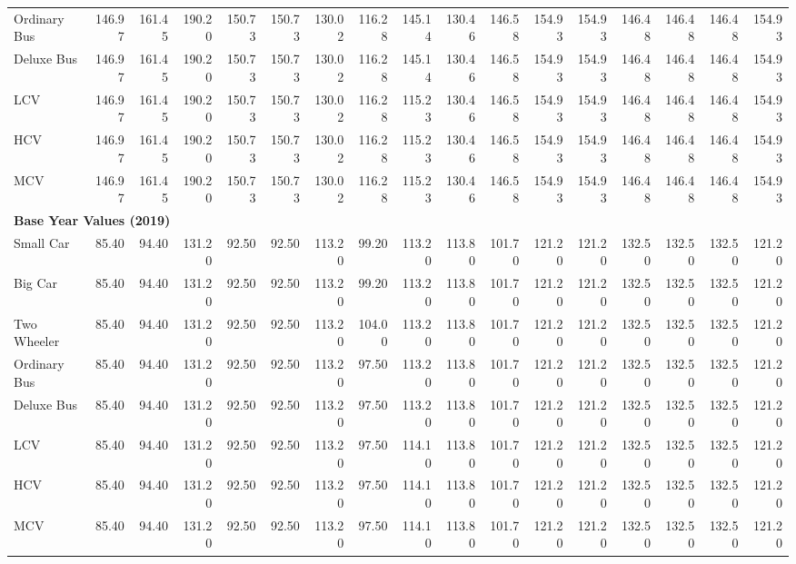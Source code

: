 \documentclass[12pt,a4paper]{article}
\begin{document}
\begin{landscape}
\begin{table}[H]
\begin{adjustbox}{width=\linewidth}
\begin{tabular}{lrrrrrrrrrrrrrrrr}
Ordinary Bus&146.97&161.45&190.20&150.73&150.73&130.02&116.28&145.14&130.46&146.58&154.93&154.93&146.48&146.48&146.48&154.93\\%
Deluxe Bus&146.97&161.45&190.20&150.73&150.73&130.02&116.28&145.14&130.46&146.58&154.93&154.93&146.48&146.48&146.48&154.93\\%
LCV&146.97&161.45&190.20&150.73&150.73&130.02&116.28&115.23&130.46&146.58&154.93&154.93&146.48&146.48&146.48&154.93\\%
HCV&146.97&161.45&190.20&150.73&150.73&130.02&116.28&115.23&130.46&146.58&154.93&154.93&146.48&146.48&146.48&154.93\\%
MCV&146.97&161.45&190.20&150.73&150.73&130.02&116.28&115.23&130.46&146.58&154.93&154.93&146.48&146.48&146.48&154.93\\%
\midrule%
\multicolumn{17}{l}{\textbf{Base Year Values (2019)}} \\%
\midrule%
Small Car&85.40&94.40&131.20&92.50&92.50&113.20&99.20&113.20&113.80&101.70&121.20&121.20&132.50&132.50&132.50&121.20\\%
Big Car&85.40&94.40&131.20&92.50&92.50&113.20&99.20&113.20&113.80&101.70&121.20&121.20&132.50&132.50&132.50&121.20\\%
Two Wheeler&85.40&94.40&131.20&92.50&92.50&113.20&104.00&113.20&113.80&101.70&121.20&121.20&132.50&132.50&132.50&121.20\\%
Ordinary Bus&85.40&94.40&131.20&92.50&92.50&113.20&97.50&113.20&113.80&101.70&121.20&121.20&132.50&132.50&132.50&121.20\\%
Deluxe Bus&85.40&94.40&131.20&92.50&92.50&113.20&97.50&113.20&113.80&101.70&121.20&121.20&132.50&132.50&132.50&121.20\\%
LCV&85.40&94.40&131.20&92.50&92.50&113.20&97.50&114.10&113.80&101.70&121.20&121.20&132.50&132.50&132.50&121.20\\%
HCV&85.40&94.40&131.20&92.50&92.50&113.20&97.50&114.10&113.80&101.70&121.20&121.20&132.50&132.50&132.50&121.20\\%
MCV&85.40&94.40&131.20&92.50&92.50&113.20&97.50&114.10&113.80&101.70&121.20&121.20&132.50&132.50&132.50&121.20\\%
\bottomrule%
\end{tabular}\end{adjustbox}%
\end{table}



\normalsize

\endgroup

\end{landscape}
\end{document}
